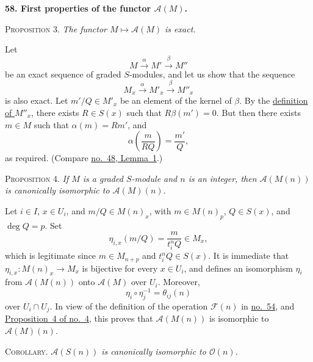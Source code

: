 
\label{fac:III:2:no:58}
\textbf{58. First properties of the functor $\mathcal{A}(M)$.}

\label{fac:III:2:no:58:prop:3}
\textsc{Proposition 3.} \textit{The functor $M\mapsto\mathcal{A}(M)$ is exact.}

Let
\label{fac:III:2:no:58:formula:graded-exact-sequence}
\[
M\xrightarrow{\alpha}M'\xrightarrow{\beta}M''
\]
be an exact sequence of graded $S$-modules, and let us show that the
sequence
\label{fac:III:2:no:58:formula:stalk-exact-sequence}
\[
M_x\xrightarrow{\alpha}M'_x\xrightarrow{\beta}M''_x
\]
is also exact. Let $m'/Q\in M'_x$ be an element of the kernel of $\beta$.
By the \hyperref[fac:III:2:no:57:def:M-U]{definition of $M''_x$}, there exists $R\in S(x)$ such that
$R\beta(m')=0$. But then there exists $m\in M$ such that
$\alpha(m)=Rm'$, and
\label{fac:III:2:no:58:formula:preimage}
\[
\alpha\!\left(\frac{m}{RQ}\right)=\frac{m'}{Q},
\]
as required. (Compare \hyperref[fac:II:4:lemma:1]{no.~48, Lemma~1}.)

\label{fac:III:2:no:58:prop:4}
\textsc{Proposition 4.} \textit{If $M$ is a graded $S$-module and $n$ is
an integer, then $\mathcal{A}(M(n))$ is canonically isomorphic to
$\mathcal{A}(M)(n)$.}

Let $i\in I$, $x\in U_i$, and $m/Q\in M(n)_x$, with
$m\in M(n)_p$, $Q\in S(x)$, and $\deg Q=p$. Set
\label{fac:III:2:no:58:formula:eta}
\[
\eta_{i,x}(m/Q)=\frac{m}{t_i^nQ}\in M_x,
\]
which is legitimate since $m\in M_{n+p}$ and $t_i^nQ\in S(x)$. It is
immediate that $\eta_{i,x}:M(n)_x\to M_x$ is bijective for every
$x\in U_i$, and defines an isomorphism $\eta_i$ from
$\mathcal{A}(M(n))$ onto $\mathcal{A}(M)$ over $U_i$. Moreover,
\label{fac:III:2:no:58:formula:eta-transition}
\[
\eta_i\circ\eta_j^{-1}=\theta_{ij}(n)
\]
over $U_i\cap U_j$. In view of the definition of the operation
$\mathcal{F}(n)$ in \hyperref[fac:III:2:no:54]{no.~54}, and
\hyperref[fac:I:1:no:4:prop:4]{Proposition~4 of no.~4}, this proves that
$\mathcal{A}(M(n))$ is isomorphic to
$\mathcal{A}(M)(n)$.

\label{fac:III:2:no:58:corollary}
\textsc{Corollary.} \textit{$\mathcal{A}(S(n))$ is canonically isomorphic
to $\mathcal{O}(n)$.}

